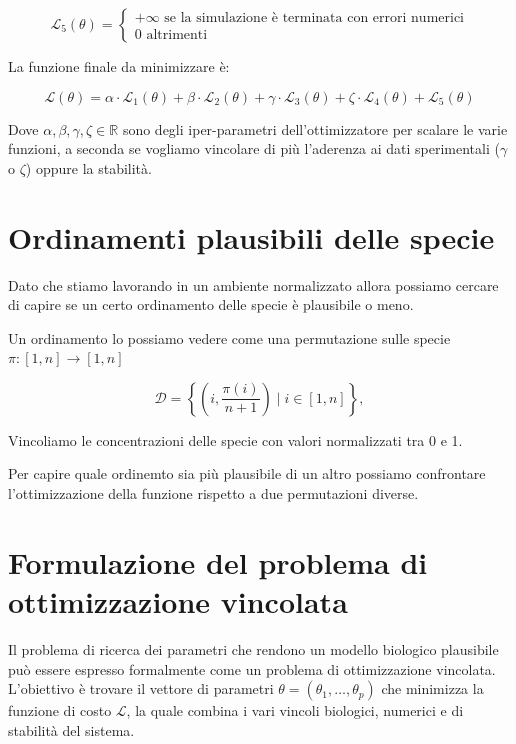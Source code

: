 \begin{equation}
    \mathcal{L}_5(\theta) = \begin{cases}
        +\infty \text{ se la simulazione è terminata con errori numerici}\\
        0 \text{ altrimenti}
    \end{cases}
\end{equation}

La funzione finale da minimizzare è:

\begin{equation}
    \mathcal{L}(\theta) = \alpha \cdot \mathcal{L}_1(\theta) + \beta \cdot \mathcal{L}_2(\theta) + \gamma \cdot \mathcal{L}_3(\theta) + \zeta \cdot \mathcal{L}_4(\theta) + \mathcal{L}_5(\theta)
\end{equation}

Dove $\alpha, \beta , \gamma, \zeta \in \mathbb{R}$ sono degli iper-parametri dell'ottimizzatore per scalare
le varie funzioni, a seconda se vogliamo vincolare di più l'aderenza ai dati sperimentali ($\gamma$ o $\zeta$) oppure la stabilità.

\section{Ordinamenti plausibili delle specie}

Dato che stiamo lavorando in un ambiente normalizzato allora possiamo
cercare di capire se un certo ordinamento delle specie è plausibile o meno.

Un ordinamento lo possiamo vedere come una permutazione sulle specie $\pi: [1,n] \rightarrow [1,n]$

\begin{equation}
    \mathcal{D} = \left\{ \left( i,\frac{\pi(i)}{n+1} \right) \mid i \in [1,n]\right\},
\end{equation}

Vincoliamo le concentrazioni delle specie con valori normalizzati tra 0 e 1.

Per capire quale ordinemto sia più plausibile di un altro possiamo confrontare l'ottimizzazione della funzione rispetto a due permutazioni diverse.

\pagebreak

\section{Formulazione del problema di ottimizzazione vincolata}

Il problema di ricerca dei parametri che rendono un modello biologico plausibile può essere espresso formalmente come un problema di ottimizzazione vincolata.
L'obiettivo è trovare il vettore di parametri $\theta = (\theta_1, \dots, \theta_p)$ che minimizza la funzione di costo $\mathcal{L}$, la quale combina
i vari vincoli biologici, numerici e di stabilità del sistema.

